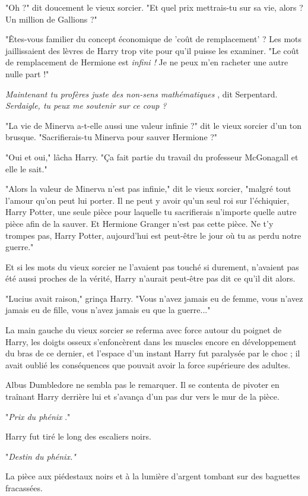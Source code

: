 "Oh ?" dit doucement le vieux sorcier. "Et quel prix mettrais-tu sur sa vie, alors ? Un million de Gallions ?"

"Êtes-vous familier du concept économique de 'coût de remplacement' ? Les mots jaillissaient des lèvres de Harry trop vite pour qu'il puisse les examiner. "Le coût de remplacement de Hermione est \emph{infini !}  Je ne peux m'en racheter une autre nulle part !"

\emph{Maintenant tu profères juste des non-sens mathématiques} , dit Serpentard. \emph{Serdaigle, tu peux me soutenir sur ce coup ?} 

"La vie de Minerva a-t-elle aussi une valeur infinie ?" dit le vieux sorcier d'un ton brusque. "Sacrifierais-tu Minerva pour sauver Hermione ?"

"Oui et oui," lâcha Harry. "Ça fait partie du travail du professeur McGonagall et elle le sait."

"Alors la valeur de Minerva n'est pas infinie," dit le vieux sorcier, "malgré tout l'amour qu'on peut lui porter. Il ne peut y avoir qu'un seul roi sur l'échiquier, Harry Potter, une seule pièce pour laquelle tu sacrifierais n'importe quelle autre pièce afin de la sauver. Et Hermione Granger n'est pas cette pièce. Ne t'y trompes pas, Harry Potter, aujourd'hui est peut-être le jour où tu as perdu notre guerre."

Et si les mots du vieux sorcier ne l'avaient pas touché si durement, n'avaient pas été aussi proches de la vérité, Harry n'aurait peut-être pas dit ce qu'il dit alors.

"Lucius avait raison," grinça Harry. "Vous n'avez jamais eu de femme, vous n'avez jamais eu de fille, vous n'avez jamais eu que la guerre..."

La main gauche du vieux sorcier se referma avec force autour du poignet de Harry, les doigts osseux s'enfoncèrent dans les muscles encore en développement du bras de ce dernier, et l'espace d'un instant Harry fut paralysée par le choc ; il avait oublié les conséquences que pouvait avoir la force supérieure des adultes.

Albus Dumbledore ne sembla pas le remarquer. Il se contenta de pivoter en traînant Harry derrière lui et s'avança d'un pas dur vers le mur de la pièce.

"\emph{Prix du phénix } ."

Harry fut tiré le long des escaliers noirs.

"\emph{Destin du phénix."} 

La pièce aux piédestaux noirs et à la lumière d'argent tombant sur des baguettes fracassées.

